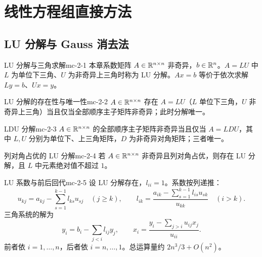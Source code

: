 \chapter{线性方程组直接方法}

\section{LU 分解与 Gauss 消去法}

\begin{definition}{LU 分解与三角求解}{mc-2-1}
本章系数矩阵 $A\in\mathbb{R}^{n\times n}$ 非奇异，$b\in\mathbb{R}^n$。$A=LU$ 中 $L$ 为单位下三角、$U$ 为非奇异上三角时称为 LU 分解。$Ax=b$ 等价于依次求解 $Ly=b$、$Ux=y$。
\end{definition}

\begin{theorem}{LU 分解的存在性与唯一性}{mc-2-2}
$A\in\mathbb{R}^{n\times n}$ 存在 $A=LU$（$L$ 单位下三角，$U$ 非奇异上三角）当且仅当全部顺序主子矩阵非奇异；此时分解唯一。
\end{theorem}

\begin{corollary}{LDU 分解}{mc-2-3}
$A\in\mathbb{R}^{n\times n}$ 的全部顺序主子矩阵非奇异当且仅当 $A=LDU$，其中 $L,U$ 分别为单位下、上三角矩阵，$D$ 为非奇异对角矩阵；三者唯一。
\end{corollary}

\begin{theorem}{列对角占优的 LU 分解}{mc-2-4}
若 $A\in\mathbb{R}^{n\times n}$ 非奇异且列对角占优，则存在 LU 分解，且 $L$ 中元素绝对值不超过 $1$。
\end{theorem}

\begin{proposition}{LU 系数与前后回代}{mc-2-5}
设 LU 分解存在，$l_{ii}=1$。系数按列递推：
\[
u_{kj}=a_{kj}-\sum_{s=1}^{k-1}l_{ks}u_{sj}\quad(j\geq k),\qquad
l_{ik}=\frac{a_{ik}-\sum_{s=1}^{k-1}l_{is}u_{sk}}{u_{kk}}\quad(i>k).
\]
三角系统的解为
\[y_i=b_i-\sum_{j<i}l_{ij}y_j,\qquad x_i=\frac{y_i-\sum_{j>i}u_{ij}x_j}{u_{ii}}.\]
前者依 $i=1,\ldots,n$，后者依 $i=n,\ldots,1$。总运算量约 $2n^3/3+O(n^2)$。
\end{proposition}

